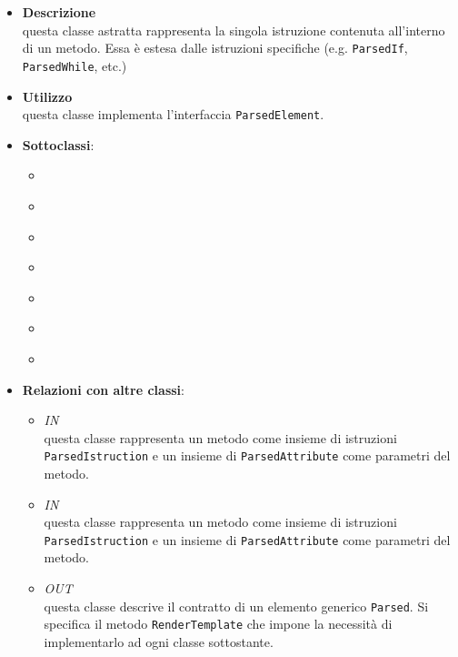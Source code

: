 \label{\nogloxy{swedesigner::server::project::ParsedInstruction}}
\begin{itemize}
\item \textbf{Descrizione}\\
questa classe astratta rappresenta la singola istruzione contenuta all'interno di un metodo. Essa è estesa dalle istruzioni specifiche (e.g. \texttt{ParsedIf}, \texttt{ParsedWhile}, etc.)
\item \textbf{Utilizzo}\\
questa classe implementa l'interfaccia \texttt{ParsedElement}.
\item \textbf{Sottoclassi}:
\begin{itemize}
\item \hyperref[\nogloxy{swedesigner::server::project::ParsedCustom}]{}
\item \hyperref[\nogloxy{swedesigner::server::project::ParsedElse}]{}
\item \hyperref[\nogloxy{swedesigner::server::project::ParsedFor}]{}
\item \hyperref[\nogloxy{swedesigner::server::project::ParsedIf}]{}
\item \hyperref[\nogloxy{swedesigner::server::project::ParsedReturn}]{}
\item \hyperref[\nogloxy{swedesigner::server::project::ParsedStatement}]{}
\item \hyperref[\nogloxy{swedesigner::server::project::ParsedWhile}]{}
\end{itemize}
\item \textbf{Relazioni con altre classi}:
\begin{itemize}
\item \textit{IN} \hyperref[\nogloxy{swedesigner::server::project::ParsedMethod}]{}\\
questa classe rappresenta un metodo come insieme di istruzioni \texttt{ParsedIstruction} e un insieme di \texttt{ParsedAttribute} come parametri del metodo.
\item \textit{IN} \hyperref[\nogloxy{swedesigner::server::project::ParsedMethod}]{}\\
questa classe rappresenta un metodo come insieme di istruzioni \texttt{ParsedIstruction} e un insieme di \texttt{ParsedAttribute} come parametri del metodo.
\item \textit{OUT} \hyperref[\nogloxy{swedesigner::server::project::ParsedElement}]{}\\
questa classe descrive il contratto di un elemento generico \texttt{Parsed}. Si specifica il metodo \texttt{RenderTemplate} che impone la necessità di implementarlo ad ogni classe sottostante.
\end{itemize}
\end{itemize}

